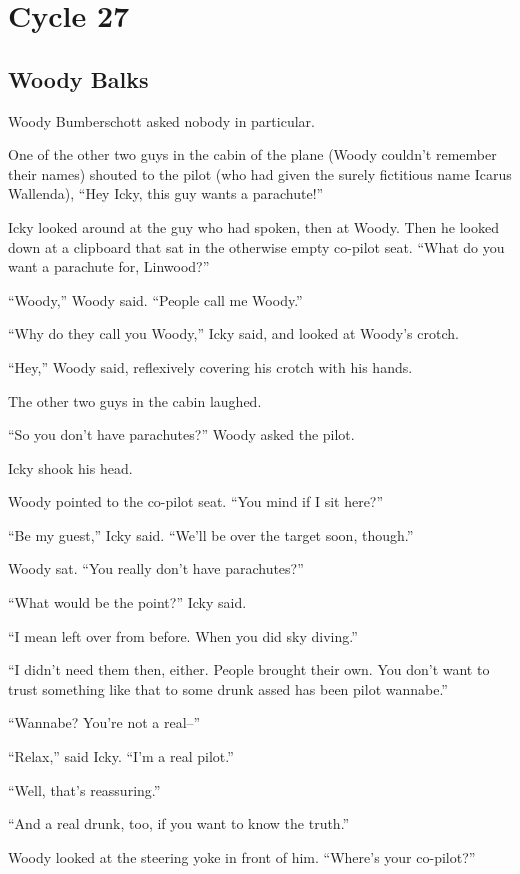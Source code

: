 \chapter{Cycle 27}

\section{Woody Balks}

 Woody Bumberschott asked nobody in particular.

One of the other two guys in the cabin of the plane (Woody couldn’t remember their names) shouted to the pilot (who had given the surely fictitious name Icarus Wallenda), “Hey Icky, this guy wants a parachute!”

Icky looked around at the guy who had spoken, then at Woody. Then he looked down at a clipboard that sat in the otherwise empty co-pilot seat. “What do you want a parachute for, Linwood?”

“Woody,” Woody said. “People call me Woody.”

“Why do they call you Woody,” Icky said, and looked at Woody’s crotch.

“Hey,” Woody said, reflexively covering his crotch with his hands.

The other two guys in the cabin laughed.

“So you don’t have parachutes?” Woody asked the pilot.

Icky shook his head.

Woody pointed to the co-pilot seat. “You mind if I sit here?”

“Be my guest,” Icky said. “We’ll be over the target soon, though.”

Woody sat. “You really don’t have parachutes?”

“What would be the point?” Icky said.

“I mean left over from before. When you did sky diving.”

“I didn’t need them then, either. People brought their own. You don’t want to trust something like that to some drunk assed has been pilot wannabe.”

“Wannabe? You’re not a real–”

“Relax,” said Icky. “I’m a real pilot.”

“Well, that’s reassuring.”

“And a real drunk, too, if you want to know the truth.”

Woody looked at the steering yoke in front of him. “Where’s your co-pilot?”

